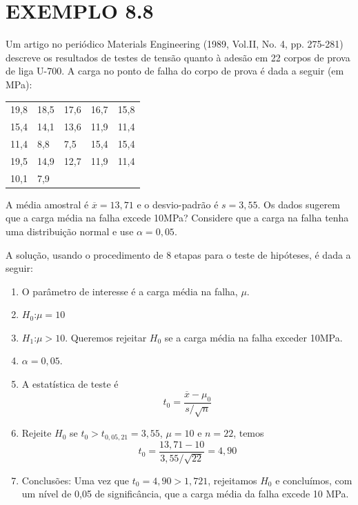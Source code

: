 \documentclass[a4paper,12pt]{article} %
\begin{document}
	\section*{EXEMPLO 8.8}
	Um artigo no periódico Materials Engineering (1989, Vol.II, No. 4, pp. 275-281) descreve os resultados de testes de tensão quanto à adesão em 22 corpos de prova de liga U-700. A carga no ponto de falha do corpo de prova é dada a seguir (em MPa):
	\begin{table}[H]
		\centering
		\begin{tabular}{lllll}
			\hline
			19,8 & 18,5 & 17,6 & 16,7 & 15,8 \\
			15,4 & 14,1 & 13,6 & 11,9 & 11,4 \\
			11,4 & 8,8  & 7,5  & 15,4 & 15,4 \\
			19,5 & 14,9 & 12,7 & 11,9 & 11,4 \\
			10,1 & 7,9  &      &      &      \\ 
			
			\hline
		\end{tabular}
	\end{table}

	A média amostral é $ \overline{x} = 13,71  $ e o desvio-padrão é $s=3,55$. Os dados sugerem que a carga média na falha excede 10MPa? Considere que a carga na falha tenha uma distribuição normal e use $ \alpha = 0,05 $.
	
	\hspace{10pt} A solução, usando o procedimento de 8 etapas para o teste de hipóteses, é dada a seguir:
	\begin{enumerate}
		\item O parâmetro de interesse é a carga média na falha, $\mu$.
		\item $H_0$:$\mu = 10$
		\item $H_1$:$\mu > 10$. Queremos rejeitar $H_0$ se a carga média na falha exceder 10MPa.
		\item $\alpha = 0,05$.
		\item A estatística de teste é
		\begin{equation*}
			t_0 = \frac{\overline{x} - \mu_0}{s/ \sqrt{n}}
		\end{equation*}
		\item Rejeite $H_0$ se $t_0 > t_{0,05, 21} = 3,55$, $\mu = 10$ e $n=22$, temos 
		\begin{equation*}
			t_0 = \frac{13,71 - 10}{3,55 / \sqrt{22}} = 4,90
		\end{equation*}
	
		\item Conclusões: Uma vez que $ t_0 = 4,90 > 1,721 $, rejeitamos $H_0$ e concluímos, com um nível de 0,05 de significância, que a carga média da falha excede 10 MPa. 
	\end{enumerate}
\end{document}
